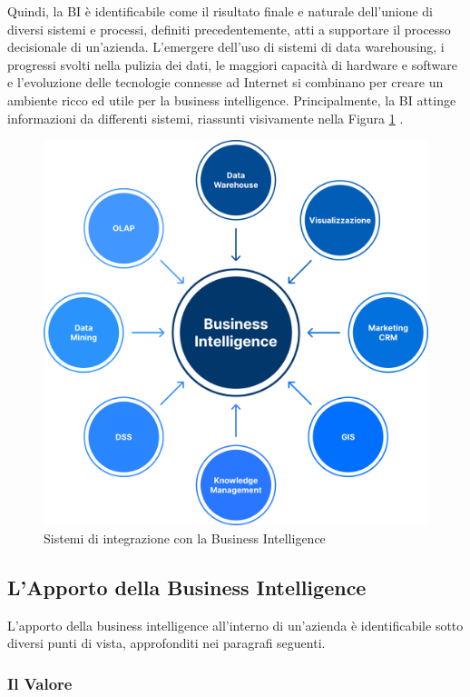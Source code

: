 Quindi, la BI è identificabile come il risultato finale e naturale dell'unione di diversi sistemi e processi, definiti precedentemente, atti a supportare il processo decisionale di un'azienda. L'emergere dell'uso di sistemi di data warehousing, i progressi svolti nella pulizia dei dati, le maggiori capacità di hardware e software e l'evoluzione delle tecnologie connesse ad Internet si combinano per creare un ambiente ricco ed utile per la business intelligence. Principalmente, la BI attinge informazioni da differenti sistemi, riassunti visivamente nella Figura \ref{fig:Business Intelligence Systems} \cite{researchgate_bi_systems}.

\begin{figure}[H]
    \centering
    \includegraphics[width=0.8\linewidth]{figure//capitolo_3/Business Intelligence Systems.pdf}
    \caption{Sistemi di integrazione con la Business Intelligence}
    \label{fig:Business Intelligence Systems}
\end{figure}

\subsection{L'Apporto della Business Intelligence}

L'apporto della business intelligence all'interno di un'azienda è identificabile sotto diversi punti di vista, approfonditi nei paragrafi seguenti.

\subsubsection{Il Valore}

